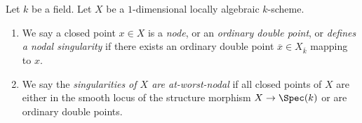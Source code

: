 \begin{definition}
\label{definition-nodal}
Let $k$ be a field. Let $X$ be a $1$-dimensional locally algebraic $k$-scheme.
\begin{enumerate}
\item We say a closed point $x \in X$ is a {\it node}, or an
{\it ordinary double point}, or {\it defines a nodal singularity}
if there exists an ordinary double point $\overline{x} \in X_{\overline{k}}$
mapping to $x$.
\item We say the {\it singularities of $X$ are at-worst-nodal} if
all closed points of $X$ are either in the smooth locus of
the structure morphism $X \to \Spec(k)$ or are ordinary double points.
\end{enumerate}
\end{definition}